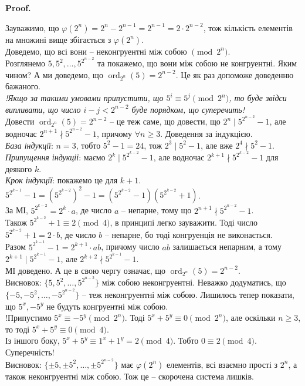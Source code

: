 \documentclass[a4paper, 10pt]{article}
\makeatletter
\theoremstyle{theoremdd}
\theoremstyle{theoremdd}
\theoremstyle{theoremdd}
\theoremstyle{theoremdd}
\theoremstyle{theoremdd}
\theoremstyle{theoremdd}
\theoremstyle{theoremdd}
\theoremstyle{theoremdd}
\renewenvironment{proof}[1][Proof.\\]{\par
\pushQED{\hfill \qed}%
\normalfont \topsep6\p@\@plus6\p@\relax
\trivlist
\item\relax
{\bfseries
#1\@addpunct{.}}\hspace\labelsep\ignorespaces
}{%
\popQED\endtrivlist\@endpefalse
}
\DeclareMathOperator{\ord}{ord}
\makeatother
\begin{document}
\begin{proof}
Зауважимо, що $\varphi(2^n) = 2^n - 2^{n-1} = 2^{n-1} = 2 \cdot 2^{n-2}$, тож кількість елементів на множині вище збігається з $\varphi(2^n)$.\\
Доведемо, що всі вони -- неконгруентні між собою $\!\!\pmod {2^n}$.\\
Розглянемо $5,5^2,\dots,5^{2^{n-2}}$ та покажемо, що вони між собою не конгруентні. Яким чином? А ми доведемо, що $\ord_{2^n} (5) = 2^{n-2}$. Це як раз допоможе доведенню бажаного.\\
\textit{!Якщо за такими умовами припустити, що $5^i \equiv 5^j \pmod {2^n}$, то буде звідси випливати, що число $i-j < 2^{n-2}$ буде порядком, що суперечить!}\\

Довести $\ord_{2^n} (5) = 2^{n-2}$ -- це теж саме, що довести, що $2^n \mid 5^{2^{n-2}}-1$, але водночас $2^{n+1} \nmid 5^{2^{n-2}} - 1$, причому $\forall n \geq 3$. Доведення за індукцією.\\
\textit{База індукції}: $n=3$, тобто $5^2-1 = 24$, тож $2^3 \mid 5^2-1$, але вже $2^4 \nmid 5^2-1$.\\
\textit{Припущення індукції}: маємо $2^k \mid 5^{2^{k-2}}-1$, але водночас $2^{k+1} \nmid 5^{2^{k-2}} - 1$ для деякого $k$.\\
\textit{Крок індукції}: покажемо це для $k+1$.\\
$5^{2^{k-1}} - 1 = (5^{2^{k-2}})^2 - 1 = \left( 5^{2^{k-2}}-1 \right) \left( 5^{2^{k-2}}+1 \right)$.\\
За МІ, $5^{2^{k-2}} = 2^k \cdot a$, де число $a$ -- непарне, тому що $2^{n+1} \nmid 5^{2^{n-2}}-1$.\\
Також $5^{2^{k-2}}+1 \equiv 2 \pmod 4$, в принципі легко зауважити. Тоді число $5^{2^{k-2}}+1 =2 \cdot b$, де число $b$ -- непарне, бо тоді конгруенція не виконається.\\
Разом $5^{2^{k-1}} -1 = 2^{k+1} \cdot ab$, причому число $ab$ залишається непарним, а тому $2^{k+1} \mid 5^{2^{k-1}} -1$, але $2^{k+2} \nmid 5^{2^{k-1}} -1$.\\
МІ доведено. А це в свою чергу означає, що $\ord_{2^n}(5) = 2^{n-2}$.
\bigskip \\
Висновок: $\{5,5^2,\dots,5^{2^{n-2}}\}$ між собою неконгруентні. Неважко додуматись, що $\{-5,-5^2,\dots,-5^{2^{n-2}}\}$ -- теж неконгруентні між собою. Лишилось тепер показати, що $5^x, -5^y$ не будуть конгруентні між собою.\\
!Припустимо $5^x \equiv - 5^y \pmod {2^n}$. Тоді $5^x + 5^y \equiv 0 \pmod {2^n}$, але оскільки $n \geq 3$, то тоді $5^x + 5^y \equiv 0 \pmod 4$.\\
Із іншого боку, $5^x + 5^y \equiv 1^x + 1^y = 2 \pmod 4$. Тобто $0 \equiv 2 \pmod 4$. Суперечність!\\
Висновок: $\{\pm 5, \pm 5^2, \dots, \pm 5^{2^{n-2}}\}$ має $\varphi(2^n)$ елементів, всі взаємно прості з $2^n$, а також неконгруентні між собою. Тож це -- скорочена система лишків.
\end{proof}
\end{document}
